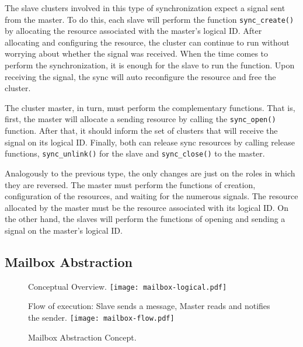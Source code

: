 
						The slave clusters involved in this type of synchronization expect
						a signal sent from the master.
						To do this, each slave will perform the function \texttt{sync\_create()}
						by allocating the resource associated with the master's logical ID.
						After allocating and configuring the resource, the cluster can
						continue to run without worrying about whether the signal was received.
						When the time comes to perform the synchronization, it is enough for
						the slave to run the function.
						Upon receiving the signal, the sync will auto reconfigure the resource
						and free the cluster.

						The cluster master, in turn, must perform the complementary functions.
						That is, first, the master will allocate a sending resource by calling
						the \texttt{sync\_open()} function.
						After that, it should inform the set of clusters that will receive the
						signal on its logical ID.
						Finally, both can release sync resources by calling release functions,
						\texttt{sync\_unlink()} for the slave and \texttt{sync\_close()} to
						the master.


						Analogously to the previous type, the only changes are just on
						the roles in which they are reversed.
						The master must perform the functions of creation, configuration
						of the resources, and waiting for the numerous signals.
						The resource allocated by the master must be the resource
						associated with its logical ID.
						On the other hand, the slaves will perform the functions of
						opening and sending a signal on the master's logical ID.

		\subsection{Mailbox Abstraction}
		\label{sec.mailbox-abs}

			\begin{figure}[!tb]
				\centering%
				\caption{Mailbox Abstraction Concept.}%
				\label{fig:conpt_mailbox}%

					{Conceptual Overview.}%
					{\texttt{[image: mailbox-logical.pdf]}}%

				\hfill

					{Flow of execution: Slave sends a message, Master reads and notifies the sender.}%
					{\texttt{[image: mailbox-flow.pdf]}}%

			\end{figure}

